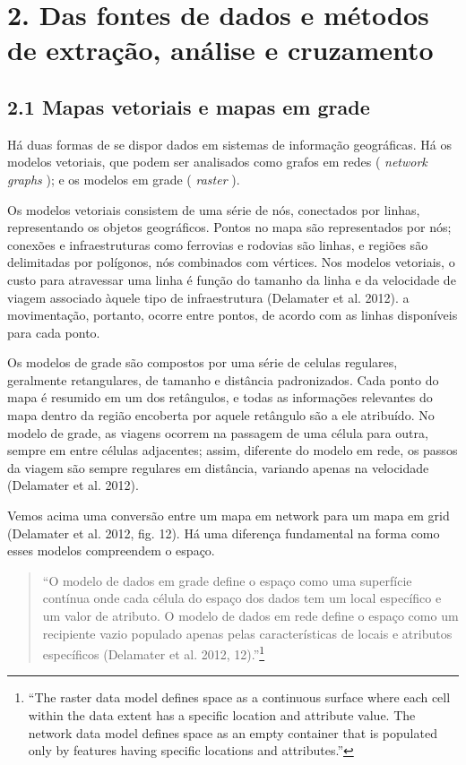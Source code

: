 \documentclass[]{article}
\let\rmarkdownfootnote\footnote%
\def\footnote{\protect\rmarkdownfootnote}
\begin{document}
\hypertarget{das-fontes-de-dados-e-metodos-de-extracao-analise-e-cruzamento}{%
\section{2. Das fontes de dados e métodos de extração, análise e
cruzamento}\label{das-fontes-de-dados-e-metodos-de-extracao-analise-e-cruzamento}}

\hypertarget{mapas-vetoriais-e-mapas-em-grade}{%
\subsection{2.1 Mapas vetoriais e mapas em
grade}\label{mapas-vetoriais-e-mapas-em-grade}}

Há duas formas de se dispor dados em sistemas de informação geográficas.
Há os modelos vetoriais, que podem ser analisados como grafos em redes (
\emph{network graphs} ); e os modelos em grade ( \emph{raster} ).

Os modelos vetoriais consistem de uma série de nós, conectados por
linhas, representando os objetos geográficos. Pontos no mapa são
representados por nós; conexões e infraestruturas como ferrovias e
rodovias são linhas, e regiões são delimitadas por polígonos, nós
combinados com vértices. Nos modelos vetoriais, o custo para atravessar
uma linha é função do tamanho da linha e da velocidade de viagem
associado àquele tipo de infraestrutura (Delamater et al. 2012). a
movimentação, portanto, ocorre entre pontos, de acordo com as linhas
disponíveis para cada ponto.

Os modelos de grade são compostos por uma série de celulas regulares,
geralmente retangulares, de tamanho e distância padronizados. Cada ponto
do mapa é resumido em um dos retângulos, e todas as informações
relevantes do mapa dentro da região encoberta por aquele retângulo são a
ele atribuído. No modelo de grade, as viagens ocorrem na passagem de uma
célula para outra, sempre em entre células adjacentes; assim, diferente
do modelo em rede, os passos da viagem são sempre regulares em
distância, variando apenas na velocidade (Delamater et al. 2012).

Vemos acima uma conversão entre um mapa em network para um mapa em grid
(Delamater et al. 2012, fig. 12). Há uma diferença fundamental na forma
como esses modelos compreendem o espaço.

\begin{quote}
``O modelo de dados em grade define o espaço como uma superfície
contínua onde cada célula do espaço dos dados tem um local específico e
um valor de atributo. O modelo de dados em rede define o espaço como um
recipiente vazio populado apenas pelas características de locais e
atributos específicos (Delamater et al. 2012, 12).''\footnote{``The
  raster data model defines space as a continuous surface where each
  cell within the data extent has a specific location and attribute
  value. The network data model defines space as an empty container that
  is populated only by features having specific locations and
  attributes.''}
\end{quote}
\end{document}
